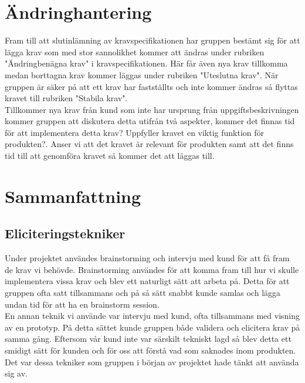 \documentclass[12pt]{article}
\begin{document}
\section{Ändringhantering}
Fram till att slutinlämning av kravspecifikationen har gruppen bestämt sig för att lägga krav som med stor sannolikhet kommer att ändras under rubriken "Ändringbenägna krav" i kravspecifikationen. Här får även nya krav tillkomma medan borttagna krav kommer läggas under rubriken "Uteslutna krav". När gruppen är säker på att ett krav har fastställts och inte kommer ändras så flyttas kravet till rubriken "Stabila krav". \\
Tillkommer nya krav från kund som inte har ursprung från uppgiftsbeskrivningen kommer gruppen att diskutera detta utifrån två aspekter, kommer det finnas tid för att implementera detta krav? Uppfyller kravet en viktig funktion för produkten?. Anser vi att det kravet är relevant för produkten samt att det finns tid till att genomföra kravet så kommer det att läggas till.  
	
\section{Sammanfattning}

\subsection{Eliciteringstekniker}
Under projektet användes brainstorming och intervju med kund för att få fram de krav vi behövde. Brainstorming användes för att komma fram till hur vi skulle implementera vissa krav och blev ett naturligt sätt att arbeta på. Detta för att gruppen ofta satt tillsammans och på så sätt snabbt kunde samlas och lägga undan tid för att ha en brainstorm session.\\
En annan teknik vi använde var intervju med kund, ofta tillsammans med visning av en prototyp. På detta sättet kunde gruppen både validera och elicitera krav på samma gång. Eftersom vår kund inte var särskilt tekniskt lagd så blev detta ett smidigt sätt för kunden och för oss att förstå vad som saknades inom produkten. \\
Det var dessa tekniker som gruppen i början av projektet hade tänkt att använda sig av.
\end{document}
